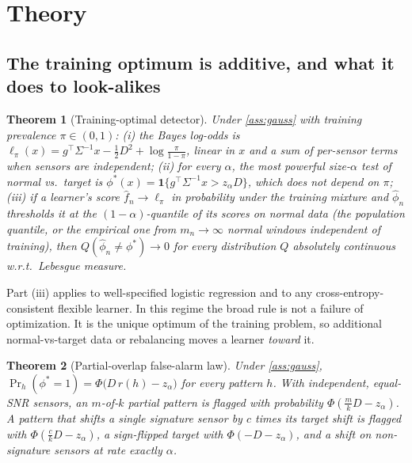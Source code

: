 \documentclass{article}
\newtheorem{theorem}{Theorem}
\theoremstyle{definition}
\theoremstyle{remark}
\renewcommand{\1}{\mathbf{1}}
\begin{document}
\section{Theory}
\label{sec:theory}
\subsection{The training optimum is additive, and what it does to look-alikes}
\label{sec:overlap}
\begin{theorem}[Training-optimal detector]\label{thm:np}
Under \cref{ass:gauss} with training prevalence $\pi\in(0,1)$:
(i) the Bayes log-odds is $\ell_\pi(x)=g^\top\Sigma^{-1}x-\frac12D^2+\log\frac{\pi}{1-\pi}$, linear in $x$ and a sum of per-sensor terms when sensors are independent;
(ii) for every $\alpha$, the most powerful size-$\alpha$ test of normal vs.\ target is $\phi^*(x)=\1\{g^\top\Sigma^{-1}x>z_\alpha D\}$, which does not depend on $\pi$;
(iii) if a learner's score $\hat f_n\to\ell_\pi$ in probability under the training mixture and $\hat\phi_n$ thresholds it at the $(1-\alpha)$-quantile of its scores on normal data (the population quantile, or the empirical one from $m_n\to\infty$ normal windows independent of training), then $Q(\hat\phi_n\ne\phi^*)\to0$ for every distribution $Q$ absolutely continuous w.r.t.\ Lebesgue measure.
\end{theorem}
Part (iii) applies to well-specified logistic regression and to any cross-entropy-consistent flexible learner. In this regime the broad rule is not a failure of optimization. It is the unique optimum of the training problem, so additional normal-vs-target data or rebalancing moves a learner \emph{toward} it.

\begin{theorem}[Partial-overlap false-alarm law]\label{thm:law}
Under \cref{ass:gauss}, $\Pr_h(\phi^*=1)=\Phi\big(D\,r(h)-z_\alpha\big)$ for every pattern $h$. With independent, equal-SNR sensors, an $m$-of-$k$ partial pattern is flagged with probability $\Phi(\tfrac{m}{k}D-z_\alpha)$. A pattern that shifts a single signature sensor by $c$ times its target shift is flagged with $\Phi(\tfrac{c}{k}D-z_\alpha)$, a sign-flipped target with $\Phi(-D-z_\alpha)$, and a shift on non-signature sensors at rate exactly $\alpha$.
\end{theorem}
\end{document}
